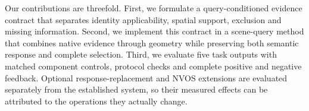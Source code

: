 Our contributions are threefold. First, we formulate a query-conditioned
evidence contract that separates identity applicability, spatial support,
exclusion and missing information. Second, we implement this contract in a
scene-query method that combines native evidence through geometry while
preserving both semantic response and complete selection. Third, we evaluate
five task outputs with matched component controls, protocol checks and complete
positive and negative feedback. Optional response-replacement and NVOS
extensions are evaluated separately from the established system, so their
measured effects can be attributed to the operations they actually change.

